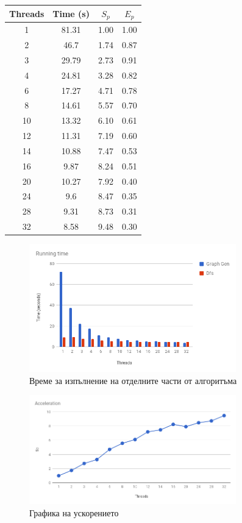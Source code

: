 \begin{tabular}{|c|c|c|c|}
\hline
Threads & Time (s) & $S_p$ & $E_p$\\
\hline \hline
1 & 81.31 & 1.00 & 1.00 \\
\hline
2 & 46.7 & 1.74 & 0.87 \\
\hline
3 & 29.79 & 2.73 & 0.91 \\
\hline
4 & 24.81 & 3.28 & 0.82 \\
\hline
6 & 17.27 & 4.71 & 0.78 \\
\hline
8 & 14.61 & 5.57 & 0.70 \\
\hline
10 & 13.32 & 6.10 & 0.61 \\
\hline
12 & 11.31 & 7.19 & 0.60 \\
\hline
14 & 10.88 & 7.47 & 0.53 \\
\hline
16 & 9.87 & 8.24 & 0.51 \\
\hline
20 & 10.27 & 7.92 & 0.40 \\
\hline
24 & 9.6 & 8.47 & 0.35 \\
\hline
28 & 9.31 & 8.73 & 0.31 \\
\hline
32 & 8.58 & 9.48 & 0.30 \\
\hline
\end{tabular}

\begin{figure}[h]
  \centering
  \includegraphics[width=0.8\textwidth]{resources/running_time.png}
  \caption{\label{fig::running_time} Време за изпълнение на отделните части от алгоритъма}
\end{figure}

\begin{figure}[h]
  \centering
  \includegraphics[width=0.8\textwidth]{resources/acceleration.png}
  \caption{\label{fig::acceleration} Графика на ускорението }
\end{figure}

